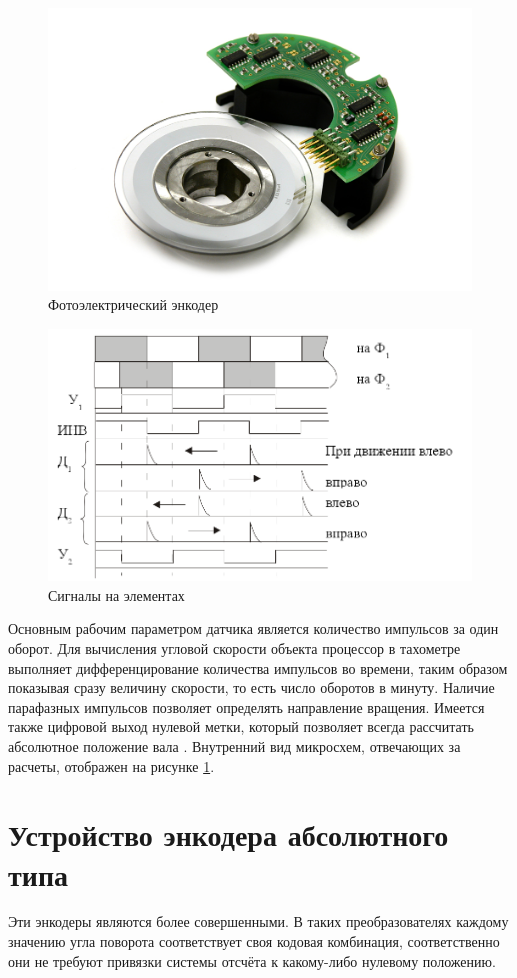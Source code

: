 \begin{figure}[ht]
    \includegraphics[width=.4\linewidth]{Figures/splitenc.png}
    \caption{Фотоэлектрический энкодер}
    \label{fig:splitenc}
\end{figure}

\begin{figure}[ht]
    \includegraphics[width=1\linewidth]{Figures/complex.png}
    \caption{Сигналы на элементах\label{fig:complex}}
\end{figure}

Основным рабочим параметром датчика является количество импульсов за один оборот. Для вычисления угловой скорости объекта процессор в тахометре выполняет дифференцирование количества импульсов во времени, таким образом показывая сразу величину скорости, то есть число оборотов в минуту. Наличие парафазных импульсов позволяет определять направление вращения. Имеется также цифровой выход нулевой метки, который позволяет всегда рассчитать абсолютное положение вала \cite{epromauto:enc}. Внутренний вид микросхем, отвечающих за расчеты, отображен на рисунке \ref{fig:splitenc}.

\section{Устройство энкодера абсолютного типа}

Эти энкодеры являются более совершенными. В таких преобразователях каждому значению угла поворота соответствует своя кодовая комбинация, соответственно они не требуют привязки системы отсчёта к какому-либо нулевому положению.

